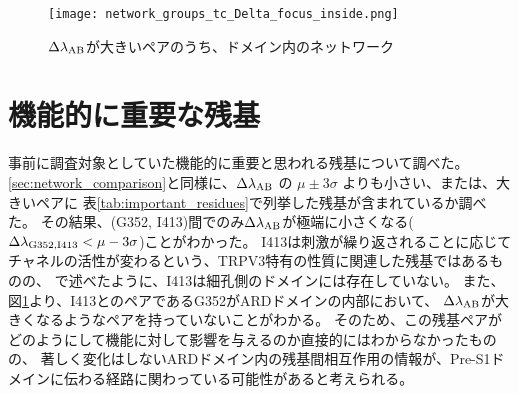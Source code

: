 \begin{figure}
  \centering
  \texttt{[image: network\_groups\_tc\_Delta\_focus\_inside.png]}
  \caption{$\Delta \lambda_{\rm{AB}}$が大きいペアのうち、ドメイン内のネットワーク}
  \label{fig:network_groups_tc_Delta_focus_inside}
\end{figure}

\section{機能的に重要な残基}

事前に調査対象としていた機能的に重要と思われる残基について調べた。
\ref{sec:network_comparison}と同様に、$\Delta \lambda_{\rm{AB}}$ の $\mu \pm 3 \sigma$ よりも小さい、または、大きいペアに
表\ref{tab:important_residues}で列挙した残基が含まれているか調べた。
その結果、(G352, I413)間でのみ$\Delta \lambda_{\rm{AB}}$が極端に小さくなる($\Delta \lambda_{\rm{G352},\rm{I413}} < \mu - 3\sigma$)ことがわかった。
I413は刺激が繰り返されることに応じてチャネルの活性が変わるという、TRPV3特有の性質に関連した残基ではあるものの、
\label{sec:important_residues}で述べたように、I413は細孔側のドメインには存在していない。
また、図\ref{fig:network_groups_tc_Delta_focus_inside}より、I413とのペアであるG352がARDドメインの内部において、
$\Delta \lambda_{\rm{AB}}$が大きくなるようなペアを持っていないことがわかる。
そのため、この残基ペアがどのようにして機能に対して影響を与えるのか直接的にはわからなかったものの、
著しく変化はしないARDドメイン内の残基間相互作用の情報が、Pre-S1ドメインに伝わる経路に関わっている可能性があると考えられる。
